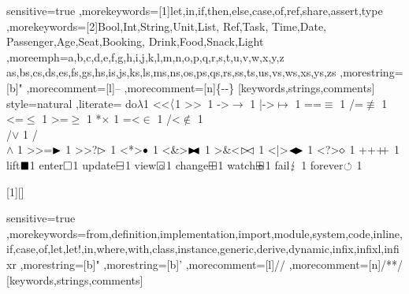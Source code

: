   {sensitive=true
  ,morekeywords=[1]{let,in,if,then,else,case,of,ref,share,assert,type}
  ,morekeywords=[2]{Bool,Int,String,Unit,List, Ref,Task, Time,Date, Passenger,Age,Seat,Booking, Drink,Food,Snack,Light}
  ,moreemph={a,b,c,d,e,f,g,h,i,j,k,l,m,n,o,p,q,r,s,t,u,v,w,x,y,z as,bs,cs,ds,es,fs,gs,hs,is,js,ks,ls,ms,ns,os,ps,qs,rs,ss,ts,us,vs,ws,xs,ys,zs}
  ,morestring=[b]"
  ,morecomment=[l]--
  ,morecomment=[n]{\{-}{-\}}
  }[keywords,strings,comments]
  {style=natural
  ,literate=
    {do}{{$\lambda$}}1
    {<<}{{$\langle$}}1
    {>>}{{$\>$ }}1
    {->}{{$\to$ }}1
    {|->}{{$\mapsto$ }}1
    {==}{{$\equiv$ }}1
    {/=}{{$\nequiv$ }}1
    {<=}{{$\leq$ }}1
    {>=}{{$\geq$ }}1
    {*}{{$\times$ }}1
    {=<}{{$\in$ }}1
    {/<}{{$\not\in$ }}1
    {\\/}{{$\vee$ }}1
    {/\\}{{$\wedge$ }}1
    {>>=}{{$\blacktriangleright$ }}1
    {>>?}{{$\rhd$ }}1
    {<*>}{{$\bullet$ }}1
    {<&>}{{$\blacktriangleright\mkern-8mu\blacktriangleleft$ }}1
    {>&<}{{$\rhd\mkern-5mu\lhd$ }}1
    {<|>}{{$\blacktriangleleft\mkern-4mu\blacktriangleright$ }}1
    {<?>}{{$\diamond$ }}1
    {++}{{$+\!\!+$ }}1
    {lift}{{$\blacksquare$}}1
    {enter}{{$\square$}}1
    {update}{{$\boxminus$}}1
    {view}{{$\square\mkern-10.33mu\circ\mkern+2mu$}}1
    {change}{{$\boxplus$}}1
    {watch}{{$\boxplus\mkern-10.33mu\circ\mkern+2mu$}}1
    {fail}{{$\lightning$ }}1
    {forever}{{$\circlearrowleft$ }}1
  }

[1][]
  {\lstset{language=tasks,style=tasks,#1}}
  {}
\newcommand{\TS}[1]{\lstinline[language=tasks,style=tasks,#1]}
% \newmacro{includeTASK}[2][]



  {sensitive=true
  ,morekeywords={from,definition,implementation,import,module,system,code,inline,if,case,of,let,let!,in,where,with,class,instance,generic,derive,dynamic,infix,infixl,infixr}
  ,morestring=[b]"
  ,morestring=[b]'
  ,morecomment=[l]//
  ,morecomment=[n]{/*}{*/}
  }[keywords,strings,comments]

